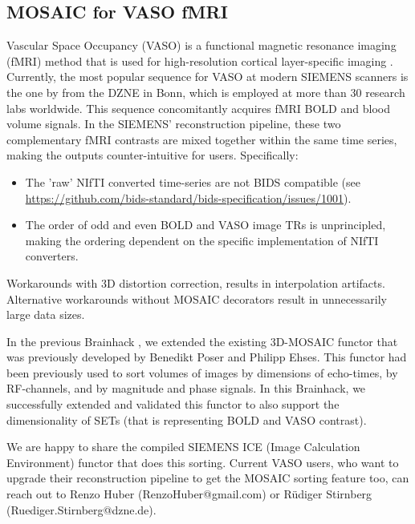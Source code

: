 \documentclass[../main.tex]{subfiles}
\begin{document}
\subsection{MOSAIC for VASO fMRI} 

%

Vascular Space Occupancy (VASO) is a functional magnetic resonance imaging (fMRI) method that is used for high-resolution cortical layer-specific imaging \parencite{Huber2021a}. Currently, the most popular sequence for VASO at modern SIEMENS scanners is the one by \textcite{Stirnberg2021a} from the DZNE in Bonn, which is employed at more than 30 research labs worldwide. This sequence concomitantly acquires fMRI BOLD and blood volume signals. In the SIEMENS' reconstruction pipeline, these two complementary fMRI contrasts are mixed together within the same time series, making the outputs counter-intuitive for users. Specifically:

\begin{itemize}
    \item The 'raw' NIfTI converted time-series are not BIDS compatible (see \href{https://github.com/bids-standard/bids-specification/issues/1001}{https://github.com/bids-standard/bids-specification/issues/1001}).
    
    \item The order of odd and even BOLD and VASO image TRs is unprincipled, making the ordering dependent on the specific implementation of NIfTI converters.
\end{itemize}

Workarounds with 3D distortion correction, results in interpolation artifacts. Alternative workarounds without MOSAIC decorators result in unnecessarily large data sizes.

In the previous Brainhack \parencite{Gau2021}, we extended the existing 3D-MOSAIC functor that was previously developed by Benedikt Poser and Philipp Ehses. This functor had been previously used to sort volumes of images by dimensions of echo-times, by RF-channels, and by magnitude and phase signals. In this Brainhack, we successfully extended and validated this functor to also support the dimensionality of SETs (that is representing BOLD and VASO contrast).

We are happy to share the compiled SIEMENS ICE (Image Calculation Environment) functor that does this sorting. Current VASO users, who want to upgrade their reconstruction pipeline to get the MOSAIC sorting feature too, can reach out to Renzo Huber (RenzoHuber@gmail.com) or R\"udiger Stirnberg (Ruediger.Stirnberg@dzne.de).
\end{document}
